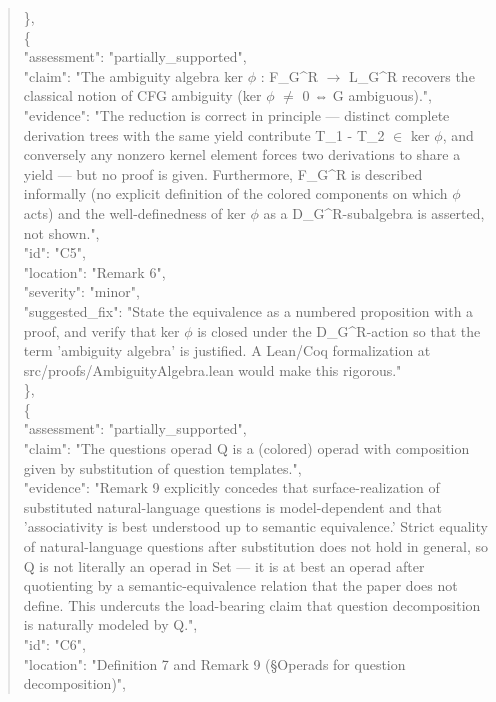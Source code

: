 \documentclass[11pt]{article}
\begin{document}
\begin{quote}
    \},\\
    \{\\
      "assessment": "partially\_supported",\\
      "claim": "The ambiguity algebra ker \ensuremath{\phi} : F\_G\^{}R \ensuremath{\to} L\_G\^{}R recovers the classical notion of CFG ambiguity (ker \ensuremath{\phi} \ensuremath{\ne} 0 ⇔ G ambiguous).",\\
      "evidence": "The reduction is correct in principle --- distinct complete derivation trees with the same yield contribute T\_1 - T\_2 \ensuremath{\in} ker \ensuremath{\phi}, and conversely any nonzero kernel element forces two derivations to share a yield --- but no proof is given. Furthermore, F\_G\^{}R is described informally (no explicit definition of the colored components on which \ensuremath{\phi} acts) and the well-definedness of ker \ensuremath{\phi} as a D\_G\^{}R-subalgebra is asserted, not shown.",\\
      "id": "C5",\\
      "location": "Remark 6",\\
      "severity": "minor",\\
      "suggested\_fix": "State the equivalence as a numbered proposition with a proof, and verify that ker \ensuremath{\phi} is closed under the D\_G\^{}R-action so that the term 'ambiguity algebra' is justified. A Lean/Coq formalization at src/proofs/AmbiguityAlgebra.lean would make this rigorous."\\
    \},\\
    \{\\
      "assessment": "partially\_supported",\\
      "claim": "The questions operad Q is a (colored) operad with composition given by substitution of question templates.",\\
      "evidence": "Remark 9 explicitly concedes that surface-realization of substituted natural-language questions is model-dependent and that 'associativity is best understood up to semantic equivalence.' Strict equality of natural-language questions after substitution does not hold in general, so Q is not literally an operad in Set --- it is at best an operad after quotienting by a semantic-equivalence relation that the paper does not define. This undercuts the load-bearing claim that question decomposition is naturally modeled by Q.",\\
      "id": "C6",\\
      "location": "Definition 7 and Remark 9 (§Operads for question decomposition)",\\

\end{quote}
\end{document}
